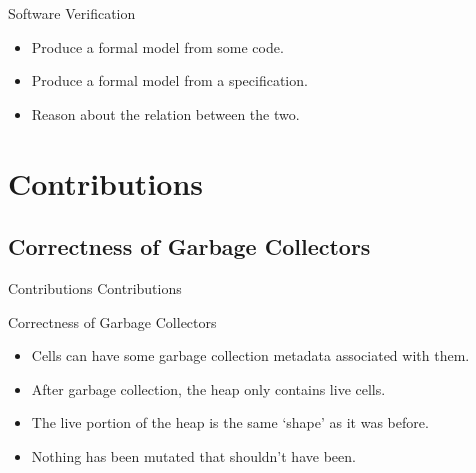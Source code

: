 \documentclass[usenames,dvipsnames]{beamer}
\begin{document}
\begin{frame}{Software Verification}
  \begin{itemize}
  \item Produce a formal model from some code.
  \item Produce a formal model from a specification.
  \item Reason about the relation between the two.
  \end{itemize}

\end{frame}


\section{Contributions}
\subsection{Correctness of Garbage Collectors}

\begin{frame}{Contributions}
  \centering \huge Contributions

\end{frame}

\begin{frame}{Correctness of Garbage Collectors}
  \begin{itemize}
  \item Cells can have some garbage collection metadata associated
    with them.
  \item After garbage collection, the heap only contains live cells.
  \item The live portion of the heap is the same `shape' as it was
    before.
  \item Nothing has been mutated that shouldn't have been.
  \end{itemize}


\end{frame}
\end{document}
